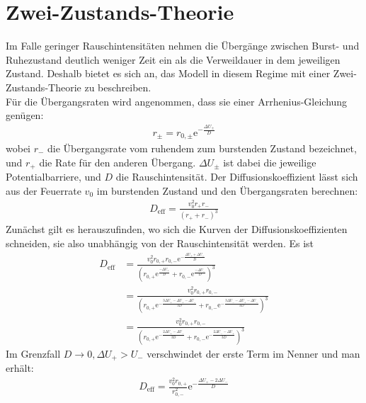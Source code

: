 \documentclass[12pt,a4paper]{article}
\begin{document}

\thispagestyle{empty}
\newpage
\tableofcontents
\thispagestyle{empty}
\newpage
{}
\section{Zwei-Zustands-Theorie}
Im Falle geringer Rauschintensitäten nehmen die Übergänge zwischen Burst- und Ruhezustand deutlich weniger Zeit ein als die Verweildauer in dem jeweiligen Zustand. Deshalb bietet es sich an, das Modell in diesem Regime mit einer Zwei-Zustands-Theorie zu beschreiben. \\
Für die Übergangsraten wird angenommen, dass sie einer Arrhenius-Gleichung genügen:
\begin{align*}
r_{\pm}=r_{0,\pm}\text{e}^{-\frac{\Delta U_{\pm}}{D}}
\end{align*}
wobei $r_-$ die Übergangsrate vom ruhendem zum burstenden Zustand bezeichnet, und $r_+$ die Rate für den anderen Übergang. $\Delta U_{\pm}$ ist dabei die jeweilige Potentialbarriere, und $D$ die Rauschintensität.  Der Diffusionskoeffizient lässt sich aus der Feuerrate $v_0$ im burstenden Zustand und den Übergangsraten berechnen:
\begin{align*}
D_{\text{eff}}=\frac{v_0^2 r_+r_-}{(r_++r_-)^3}
\end{align*}
Zunächst gilt es herauszufinden, wo sich die Kurven der Diffusionskoeffizienten schneiden, sie also unabhängig von der Rauschintensität werden. Es ist
\begin{align*}
D_{\text{eff}}&=\frac{v_0^2r_{0,+}r_{0,-}\text{e}^{-\frac{\Delta U_++\Delta U_-}{D}}}{\left(r_{0,+}\text{e}^{\frac{-\Delta U_+}{D}}+r_{0,-}\text{e}^{\frac{-\Delta U_-}{D}}\right)^3}\\&=\frac{v_0^2r_{0,+}r_{0,-}}{\left(r_{0,+}\text{e}^{-\frac{3\Delta U_+-\Delta U_+-\Delta U_-}{3D}}+r_{0,-}\text{e}^{-\frac{3\Delta U_--\Delta U_+ -\Delta U_-}{3D}}\right)^3}\\&=\frac{v_0^2r_{0,+}r_{0,-}}{\left(r_{0,+}\text{e}^{-\frac{2\Delta U_+-\Delta U_-}{3D}}+r_{0,-}\text{e}^{-\frac{2\Delta U_--\Delta U_+}{3D}}\right)^3}
\end{align*}
Im Grenzfall $D\rightarrow 0,\Delta U_+>U_-$ verschwindet der erste Term im Nenner und man erhält:
\begin{align*}
D_{\text{eff}}=\frac{v_0^2r_{0,+}}{r_{0,-}^2}\text{e}^{-\frac{\Delta U_+-2\Delta U_-}{D}}
\end{align*}
\end{document}
